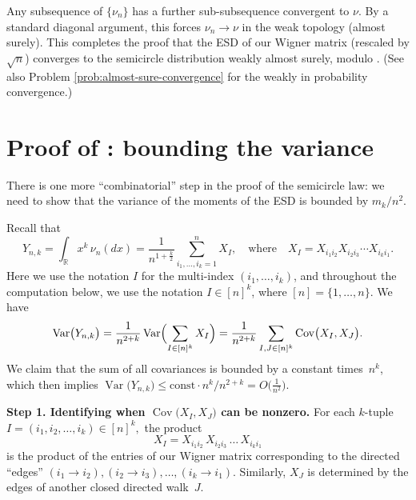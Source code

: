 \documentclass[letterpaper,11pt,oneside,reqno]{article}
\numberwithin{equation}{section}
\theoremstyle{definition}
\begin{document}
Any subsequence of \(\{\nu_n\}\) has a further
sub-subsequence convergent to \(\nu\).  By a standard
diagonal argument, this forces \(\nu_n\to\nu\) in the weak
topology (almost surely).  This completes the proof that the ESD of our
Wigner matrix (rescaled by \(\sqrt{n}\)) converges to the
semicircle distribution weakly almost surely,
modulo .
(See also Problem \ref{prob:almost-sure-convergence}
for the weakly in probability convergence.)


\section{Proof of : bounding the variance}
\label{sub:variance-bound-proof}

There is one more ``combinatorial'' step in the proof of the
semicircle law: we need to show that the variance of the
moments of the ESD is bounded by \(m_k/n^2\).

Recall that
\[
	Y_{n,k}
	=\int_{\mathbb{R}}x^k\,\nu_n(dx)
	=\frac{1}{n^{1+\frac{k}{2}}}
	\sum_{i_1,\ldots,i_k=1}^{n} X_I,
	\quad
	\text{where}
	\quad
	X_I=X_{i_1 i_2}X_{i_2 i_3}\cdots X_{i_{k}i_1}.
\]
Here we use the notation $I$ for the multi-index $(i_1,\ldots,i_k)$,
and throughout the computation below,
we use the notation $I\in[n]^k$,
where $[n]=\{1,\ldots,n\}$.
We have
\[
\operatorname{\mathrm{Var}}\bigl(Y_{n,k}\bigr)
	=
	\frac{1}{n^{2+k}}
	\operatorname{\mathrm{Var}}
	\Bigl(\sum_{I\in[n]^k}X_I\Bigr)
	=
	\frac{1}{n^{2+k}}
	\sum_{I,J\in[n]^k}
	\operatorname{\mathrm{Cov}}\bigl(X_I,X_J\bigr).
\]
We claim that the sum of all covariances is bounded by a constant times~\(n^k\), which then implies
\(\operatorname{\mathrm{Var}}\bigl(Y_{n,k}\bigr)\le \mathrm{const}\cdot n^k / n^{2+k}=O\bigl(\tfrac{1}{n^2}\bigr)\).

\medskip

\noindent
\textbf{Step 1. Identifying when \(\operatorname{\mathrm{Cov}}\bigl(X_I,X_J\bigr)\) can be nonzero.}
For each \(k\)-tuple \(I=(i_1,i_2,\dots,i_k)\in[n]^k,\) the product
\[
	X_I = X_{i_1i_2}\,X_{i_2i_3}\,\dots \,X_{i_k i_1}
\]
is the product of the entries of our Wigner matrix corresponding to the directed ``edges''
\((i_1 \to i_2), (i_2 \to i_3),\dots,(i_k \to i_1)\).
Similarly, \(X_J\) is determined by the edges of another closed directed walk~\(J\).
\end{document}
